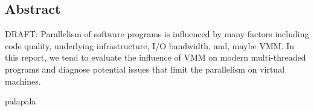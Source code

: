 \thispagestyle{empty}
\subsection*{\centering Abstract}
{\em

DRAFT: Parallelism of software programs is influenced by many factors 
including code quality, underlying infrastructure, I/O bandwidth, and,
maybe VMM. In this report, we tend to evaluate the influence of VMM on 
modern multi-threaded programs and diagnose potential issues that limit 
the parallelism on virtual machines. 

palapala

}

